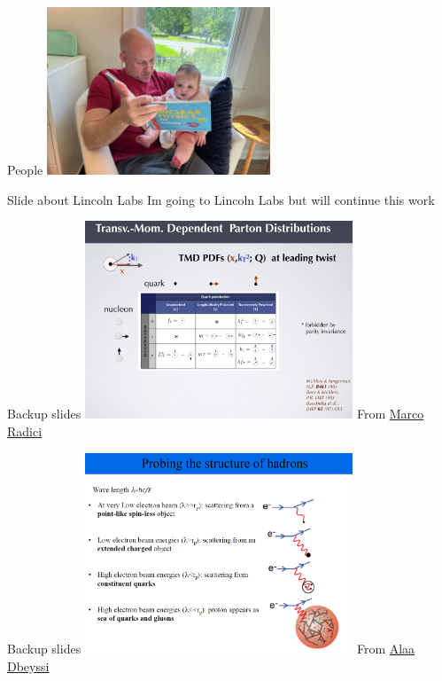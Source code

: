 \documentclass[aspectratio=169]{beamer}
\begin{document}
\begin{frame}{People}
\includegraphics[width=0.5\textwidth]{people/matt_and_maddie_nuc.jpg}
\end{frame}


\begin{frame}{Slide about Lincoln Labs}
Im going to Lincoln Labs but will continue this work
\end{frame}



\begin{frame}{Backup slides}
\centering
\includegraphics[width=0.6\textwidth]{backup/tmd_lead_twist.png}
From \href{https://indico.cern.ch/event/797767/contributions/3682622/attachments/1965784/3268756/6_radici.pdf}{Marco Radici}
\end{frame}

\begin{frame}{Backup slides}
\centering
\includegraphics[width=0.6\textwidth]{backup/scale_walkdown.png}
From \href{https://indico.gsi.de/event/6430/sessions/4600/attachments/21407/26971/AD_NucleonStructure2.pdf}{Alaa Dbeyssi}
\end{frame}
\end{document}
